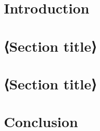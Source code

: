 \documentclass{butexFR}
\begin{document}
\fairepagedegarde
\fairemarges
\tabledematieres

\section{Introduction}

\section{⟨Section title⟩}

\section{⟨Section title⟩}

\section{Conclusion}

\merci
\end{document}
